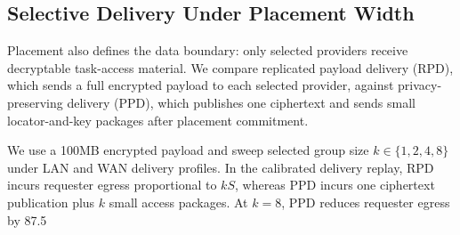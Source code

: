 \subsection{Selective Delivery Under Placement Width}
\label{subsec:eval-selective-delivery}

Placement also defines the data boundary: only selected providers receive decryptable task-access material. We compare replicated payload delivery (RPD), which sends a full encrypted payload to each selected provider, against privacy-preserving delivery (PPD), which publishes one ciphertext and sends small locator-and-key packages after placement commitment.

We use a 100MB encrypted payload and sweep selected group size $k \in \{1,2,4,8\}$ under LAN and WAN delivery profiles. In the calibrated delivery replay, RPD incurs requester egress proportional to $kS$, whereas PPD incurs one ciphertext publication plus $k$ small access packages. At $k=8$, PPD reduces requester egress by 87.5%
